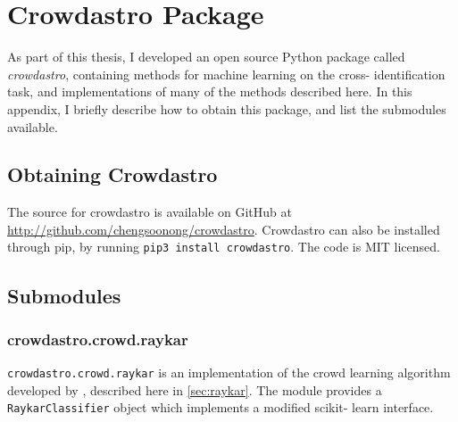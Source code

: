 
\appendix
\chapter{Crowdastro Package}

As part of this thesis, I developed an open source Python package called
\emph{crowdastro}, containing methods for machine learning on the cross-
identification task, and implementations of many of the methods described here.
In this appendix, I briefly describe how to obtain this package, and list the
submodules available.

\section{Obtaining Crowdastro}

    The source for crowdastro is available on GitHub at
    \url{http://github.com/chengsoonong/crowdastro}. Crowdastro can also be
    installed through pip, by running \texttt{pip3 install crowdastro}. The code
    is MIT licensed.

\section{Submodules}
    \label{sec:crowdastro-submodules}
    

    \subsection{crowdastro.crowd.raykar}
        \label{sec:crowdastro-raykar}

        \texttt{crowdastro.crowd.raykar} is an implementation of the crowd
        learning algorithm developed by \citet{raykar10}, described here in
        \Section \ref{sec:raykar}. The module provides a
        \texttt{RaykarClassifier} object which implements a modified scikit-
        learn interface.
